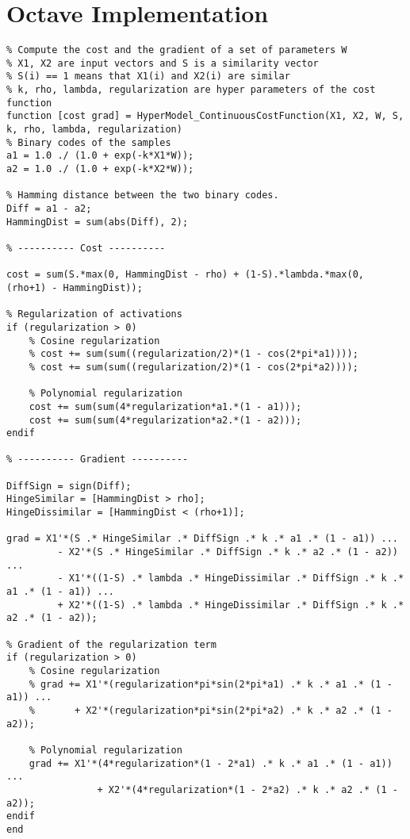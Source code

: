 \chapter{Octave Implementation}

\label{chapter:OctaveImplementation}


\begin{lstlisting}
% Compute the cost and the gradient of a set of parameters W
% X1, X2 are input vectors and S is a similarity vector
% S(i) == 1 means that X1(i) and X2(i) are similar
% k, rho, lambda, regularization are hyper parameters of the cost function
function [cost grad] = HyperModel_ContinuousCostFunction(X1, X2, W, S, k, rho, lambda, regularization)
% Binary codes of the samples
a1 = 1.0 ./ (1.0 + exp(-k*X1*W));
a2 = 1.0 ./ (1.0 + exp(-k*X2*W));

% Hamming distance between the two binary codes.
Diff = a1 - a2;
HammingDist = sum(abs(Diff), 2);

% ---------- Cost ----------

cost = sum(S.*max(0, HammingDist - rho) + (1-S).*lambda.*max(0, (rho+1) - HammingDist));

% Regularization of activations
if (regularization > 0)
	% Cosine regularization
	% cost += sum(sum((regularization/2)*(1 - cos(2*pi*a1))));
	% cost += sum(sum((regularization/2)*(1 - cos(2*pi*a2))));
	
	% Polynomial regularization
	cost += sum(sum(4*regularization*a1.*(1 - a1)));
	cost += sum(sum(4*regularization*a2.*(1 - a2)));
endif

% ---------- Gradient ----------

DiffSign = sign(Diff);
HingeSimilar = [HammingDist > rho];
HingeDissimilar = [HammingDist < (rho+1)];

grad = X1'*(S .* HingeSimilar .* DiffSign .* k .* a1 .* (1 - a1)) ...
		 - X2'*(S .* HingeSimilar .* DiffSign .* k .* a2 .* (1 - a2)) ...
		 - X1'*((1-S) .* lambda .* HingeDissimilar .* DiffSign .* k .* a1 .* (1 - a1)) ...
		 + X2'*((1-S) .* lambda .* HingeDissimilar .* DiffSign .* k .* a2 .* (1 - a2));
		 
% Gradient of the regularization term
if (regularization > 0)
	% Cosine regularization
	% grad += X1'*(regularization*pi*sin(2*pi*a1) .* k .* a1 .* (1 - a1)) ...
	%       + X2'*(regularization*pi*sin(2*pi*a2) .* k .* a2 .* (1 - a2));
	
	% Polynomial regularization
	grad += X1'*(4*regularization*(1 - 2*a1) .* k .* a1 .* (1 - a1)) ...
				+ X2'*(4*regularization*(1 - 2*a2) .* k .* a2 .* (1 - a2));
endif
end
\end{lstlisting}